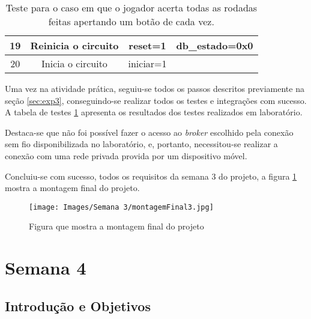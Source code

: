 \documentclass[amsmath,amssymb,floatfix]{report}
\begin{document}
\begin{table}[H]
\begin{tabular}{|cccc|}
\multicolumn{1}{|c|}{19}          & \multicolumn{1}{c|}{Reinicia o circuito} & \multicolumn{1}{c|}{reset=1}                                                            & \multicolumn{1}{c|}{db\_estado=0x0}              \\ \hline
\multicolumn{1}{|c|}{20}          & \multicolumn{1}{c|}{Inicia o circuito}       & \multicolumn{1}{c|}{iniciar=1}                                                          &                                                    \\ \hline
\end{tabular}
\caption{Teste para o caso em que o jogador acerta todas as rodadas feitas apertando um botão de cada vez.}
\label{tab:testbench31_exp}
\end{table}


Uma vez na atividade prática, seguiu-se todos os passos descritos previamente na seção \ref{sec:exp3}, conseguindo-se realizar todos os testes e integrações com sucesso. A tabela de testes \ref{tab:testbench31_exp} apresenta os resultados dos testes realizados em laboratório.

Destaca-se que não foi possível fazer o acesso ao \textit{broker} escolhido pela conexão sem fio disponibilizada no laboratório, e, portanto, necessitou-se realizar a conexão com uma rede privada provida por um dispositivo móvel.

Concluiu-se com sucesso, todos os requisitos da semana 3 do projeto, a figura \ref{fig:montagemFinal3} mostra a montagem final do projeto.

\begin{figure}[H]
\centering
\texttt{[image: Images/Semana 3/montagemFinal3.jpg]} 
    \caption{Figura que mostra a montagem final do projeto}
    \label{fig:montagemFinal3}
\end{figure}

\chapter{Semana 4}
\label{chap:semana4}

\section{Introdução e Objetivos}
\label{sec:introEObjetivos4}
\end{document}
